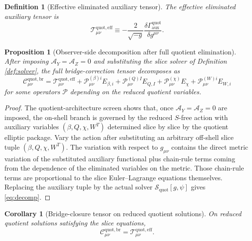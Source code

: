 \documentclass[11pt]{article}
\newcommand{\AY}{\mathcal A_Y}
\newcommand{\AZ}{\mathcal A_Z}
\newcommand{\EffAux}{\mathcal T_{\mu\nu}^{\mathrm{quot,eff}}}
\newcommand{\BridgeCorr}{\mathcal C_{\mu\nu}^{\mathrm{quot,br}}}
\newcommand{\SliceSolve}{\mathscr S_{\mathrm{quot}}}
\newtheorem{definition}{Definition}
\newtheorem{proposition}{Proposition}
\newtheorem{corollary}{Corollary}
\begin{document}
\begin{definition}[Effective eliminated auxiliary tensor]
\label{def:Teff}
The \emph{effective eliminated auxiliary tensor} is
\begin{equation}
\EffAux
\equiv
-\frac{2}{\sqrt{-g}}
\frac{\delta \Gamma_{\mathrm{aux}}^{\mathrm{quot}}}{\delta g^{\mu\nu}}.
\label{eq:Teff}
\end{equation}
\end{definition}

\begin{proposition}[Observer-side decomposition after full quotient elimination]
\label{prop:decomp}
After imposing \(\AY=\AZ=0\) and substituting the slice solver of Definition \ref{def:solver}, the full bridge-correction tensor decomposes as
\begin{equation}
\BridgeCorr
=
\EffAux
+ \mathcal P_{\mu\nu}^{(\beta)i}E_{\beta,i}
+ \mathcal P_{\mu\nu}^{(Q)I}E_{Q,I}
+ \mathcal P_{\mu\nu}^{(\chi)}E_\chi
+ \mathcal P_{\mu\nu}^{(W)i}E_{W,i}
\label{eq:decomp}
\end{equation}
for some operators \(\mathcal P\) depending on the reduced quotient variables.
\end{proposition}

\begin{proof}
The quotient-architecture screen shows that, once \(\AY=\AZ=0\) are imposed, the on-shell branch is governed by the reduced \(S\)-free action with auxiliary variables \((\beta,Q,\chi,W^T)\) determined slice by slice by the quotient elliptic package. Vary the action after substituting an arbitrary off-shell slice tuple \((\beta,Q,\chi,W^T)\). The variation with respect to \(g_{\mu\nu}\) contains the direct metric variation of the substituted auxiliary functional plus chain-rule terms coming from the dependence of the eliminated variables on the metric. Those chain-rule terms are proportional to the slice Euler--Lagrange equations themselves. Replacing the auxiliary tuple by the actual solver \(\SliceSolve[g,\psi]\) gives \eqref{eq:decomp}.
\end{proof}

\begin{corollary}[Bridge-closure tensor on reduced quotient solutions]
\label{cor:onreduced}
On reduced quotient solutions satisfying the slice equations,
\begin{equation}
\BridgeCorr=\EffAux.
\label{eq:Conreduced}
\end{equation}
\end{corollary}
\end{document}
